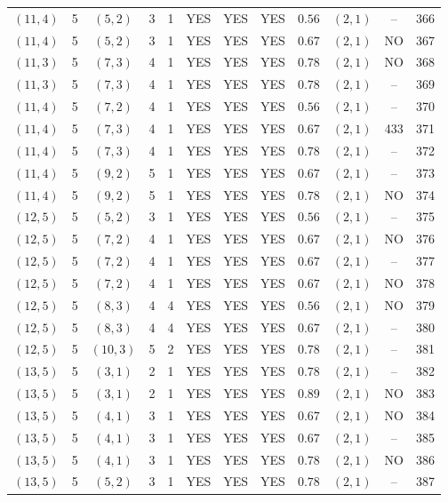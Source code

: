 \begin{longtable}{|c|c|c|c|c|c|c|c|c|c|c|c|}
$(11,4)$ & 5 & $(5,2)$ & 3 & 1 & YES & YES & YES & $0.56$ & $(2,1)$ & -- & 366\\
$(11,4)$ & 5 & $(5,2)$ & 3 & 1 & YES & YES & YES & $0.67$ & $(2,1)$ & NO & 367\\
$(11,3)$ & 5 & $(7,3)$ & 4 & 1 & YES & YES & YES & $0.78$ & $(2,1)$ & NO & 368\\
$(11,3)$ & 5 & $(7,3)$ & 4 & 1 & YES & YES & YES & $0.78$ & $(2,1)$ & -- & 369\\
$(11,4)$ & 5 & $(7,2)$ & 4 & 1 & YES & YES & YES & $0.56$ & $(2,1)$ & -- & 370\\
$(11,4)$ & 5 & $(7,3)$ & 4 & 1 & YES & YES & YES & $0.67$ & $(2,1)$ & 433 & 371\\
$(11,4)$ & 5 & $(7,3)$ & 4 & 1 & YES & YES & YES & $0.78$ & $(2,1)$ & -- & 372\\
$(11,4)$ & 5 & $(9,2)$ & 5 & 1 & YES & YES & YES & $0.67$ & $(2,1)$ & -- & 373\\
$(11,4)$ & 5 & $(9,2)$ & 5 & 1 & YES & YES & YES & $0.78$ & $(2,1)$ & NO & 374\\
$(12,5)$ & 5 & $(5,2)$ & 3 & 1 & YES & YES & YES & $0.56$ & $(2,1)$ & -- & 375\\
$(12,5)$ & 5 & $(7,2)$ & 4 & 1 & YES & YES & YES & $0.67$ & $(2,1)$ & NO & 376\\
$(12,5)$ & 5 & $(7,2)$ & 4 & 1 & YES & YES & YES & $0.67$ & $(2,1)$ & -- & 377\\
$(12,5)$ & 5 & $(7,2)$ & 4 & 1 & YES & YES & YES & $0.67$ & $(2,1)$ & NO & 378\\
$(12,5)$ & 5 & $(8,3)$ & 4 & 4 & YES & YES & YES & $0.56$ & $(2,1)$ & NO & 379\\
$(12,5)$ & 5 & $(8,3)$ & 4 & 4 & YES & YES & YES & $0.67$ & $(2,1)$ & -- & 380\\
$(12,5)$ & 5 & $(10,3)$ & 5 & 2 & YES & YES & YES & $0.78$ & $(2,1)$ & -- & 381\\
$(13,5)$ & 5 & $(3,1)$ & 2 & 1 & YES & YES & YES & $0.78$ & $(2,1)$ & -- & 382\\
$(13,5)$ & 5 & $(3,1)$ & 2 & 1 & YES & YES & YES & $0.89$ & $(2,1)$ & NO & 383\\
$(13,5)$ & 5 & $(4,1)$ & 3 & 1 & YES & YES & YES & $0.67$ & $(2,1)$ & NO & 384\\
$(13,5)$ & 5 & $(4,1)$ & 3 & 1 & YES & YES & YES & $0.67$ & $(2,1)$ & -- & 385\\
$(13,5)$ & 5 & $(4,1)$ & 3 & 1 & YES & YES & YES & $0.78$ & $(2,1)$ & NO & 386\\
$(13,5)$ & 5 & $(5,2)$ & 3 & 1 & YES & YES & YES & $0.78$ & $(2,1)$ & -- & 387\\

\end{longtable}
